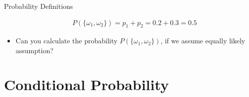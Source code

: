 \documentclass[8pt, usepdftitle = false]{beamer}
\begin{document}
\begin{frame}[allowframebreaks]{Probability Definitions}
\begin{itemize}
\begin{align*}
P(\{\omega_1, \omega_2 \}) = p_1 + p_2 = 0.2 + 0.3 = 0.5
\end{align*}

\item Can you calculate the probability $P(\{\omega_1, \omega_2 \})$, if we assume equally likely assumption?











\end{itemize}

\end{frame}



\section{Conditional Probability}
\frame{\sectionpage}
\end{document}

